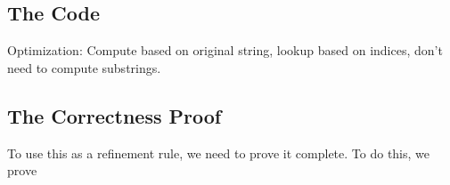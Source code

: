   \subsection{The Code}
 
    Optimization: Compute based on original string, lookup based on indices, don't need to compute substrings.
  \subsection{The Correctness Proof}
    To use this as a refinement rule, we need to prove it complete.  To do this, we prove 

 

